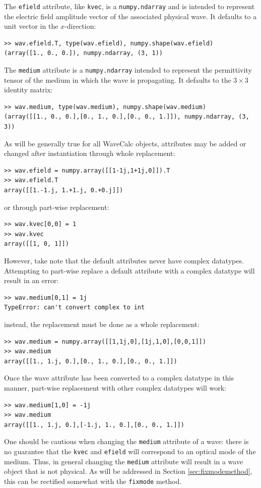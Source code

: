 \documentclass[11pt, reqno]{book}%
\newcounter{ct}
\newcommand{\tw}[1]{{\tt #1}}
\begin{document}
 The \tw{efield} attribute, like \tw{kvec}, is a \tw{numpy.ndarray} and is intended to represent the electric field amplitude vector of the associated physical wave. It defaults to a unit vector in the $x$-direction:
\begin{verbatim}
>> wav.efield.T, type(wav.efield), numpy.shape(wav.efield) 
(array([1., 0., 0.]), numpy.ndarray, (3, 1))
\end{verbatim}
\noindent The \tw{medium} attribute is a \tw{numpy.ndarray} intended to represent the permittivity tensor of the medium in which the wave is propagating. It defaults to the $3\times 3$ identity matrix:
\begin{verbatim}
>> wav.medium, type(wav.medium), numpy.shape(wav.medium)
(array([[1., 0., 0.],[0., 1., 0.],[0., 0., 1.]]), numpy.ndarray, (3, 3))
\end{verbatim}
\noindent As will be generally true for all WaveCalc objects, attributes may be added or changed after instantiation through whole replacement:
\begin{verbatim}
>> wav.efield = numpy.array([[1-1j,1+1j,0]]).T
>> wav.efield.T
array([[1.-1.j, 1.+1.j, 0.+0.j]])
\end{verbatim}
\noindent or through part-wise replacement:
\begin{verbatim}
>> wav.kvec[0,0] = 1
>> wav.kvec
array([[1, 0, 1]])
\end{verbatim}
\noindent However, take note that the default attributes never have complex datatypes. Attempting to part-wise replace a default attribute with a complex datatype will result in an error:
\begin{verbatim}
>> wav.medium[0,1] = 1j
TypeError: can't convert complex to int
\end{verbatim}
\noindent instead, the replacement must be done as a whole replacement:
\begin{verbatim}
>> wav.medium = numpy.array([[1,1j,0],[1j,1,0],[0,0,1]])
>> wav.medium
array([[1., 1.j, 0.],[0., 1., 0.],[0., 0., 1.]])
\end{verbatim}
\noindent Once the wave attribute has been converted to a complex datatype in this manner, part-wise replacement with other complex datatypes will work:
\begin{verbatim}
>> wav.medium[1,0] = -1j
>> wav.medium
array([[1., 1.j, 0.],[-1.j, 1., 0.],[0., 0., 1.]])
\end{verbatim}
One should be cautious when changing the \tw{medium} attribute of a wave: there is no guarantee that the \tw{kvec} and \tw{efield} will correspond to an optical mode of the medium. Thus, in general changing the \tw{medium} attribute will result in a wave object that is not physical. As will be addressed in Section \ref{sec:fixmodemethod}, this can be rectified somewhat with the \tw{fixmode} method.
\end{document}
